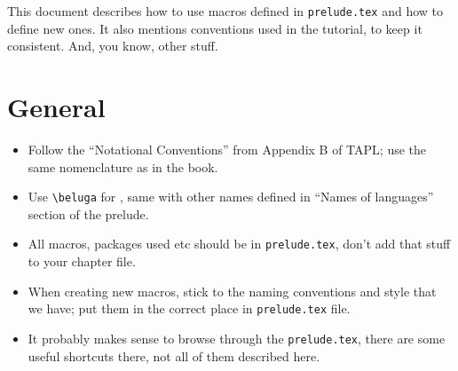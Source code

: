 \documentclass[12pt]{article}
\begin{document}
This document describes how to use macros defined in \verb#prelude.tex# and how to define new ones. It also mentions conventions used in the tutorial, to keep it consistent. And, you know, other stuff.

\section{General}
\begin{itemize}
\item Follow the ``Notational Conventions'' from Appendix B of TAPL; use the same nomenclature as in the book.
\item Use \verb#\beluga# for \beluga, same with other names defined in ``Names of languages'' section of the prelude.
\item All macros, packages used etc should be in \verb#prelude.tex#, don't add that stuff to your chapter file.
\item When creating new macros, stick to the naming conventions and style that we have; put them in the correct place in \verb#prelude.tex# file.
\item It probably makes sense to browse through the \verb#prelude.tex#, there are some useful shortcuts there, not all of them described here.
\end{itemize}
\end{document}
